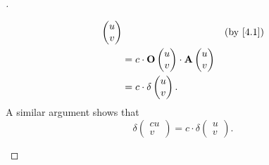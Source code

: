 \begin{proof}[]
\begin{enumerate}
\begin{align*}
{\begin{pmatrix}
					                                                                                                     u \\
					                                                                                                     v
				                                                                                                     \end{pmatrix}} &  & \by{4.1} \\
			                            & = c \cdot \mathbf{O}\begin{pmatrix}
				                                                  u \\
				                                                  v
			                                                  \end{pmatrix} \cdot \mathbf{A}\begin{pmatrix}
				                                                                                u \\
				                                                                                v
			                                                                                \end{pmatrix}                                    \\
			                            & = c \cdot \delta\begin{pmatrix}
				                                              u \\
				                                              v
			                                              \end{pmatrix}.
		      \end{align*}
		      A similar argument shows that
		      \[
			      \delta\begin{pmatrix}
				      cu \\
				      v
			      \end{pmatrix} = c \cdot \delta\begin{pmatrix}
				      u \\
				      v
			      \end{pmatrix}.
		      \]


\end{enumerate}
\end{proof}
